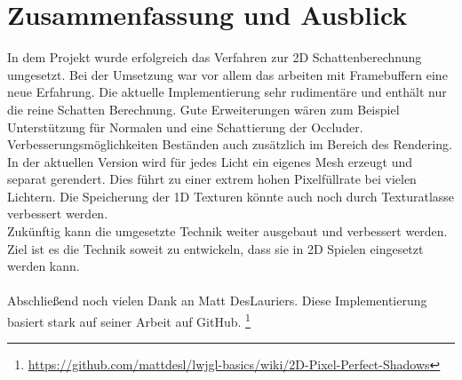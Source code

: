 \chapter{Zusammenfassung und Ausblick}
In dem Projekt wurde erfolgreich das Verfahren zur 2D Schattenberechnung umgesetzt.
Bei der Umsetzung war vor allem das arbeiten mit Framebuffern eine neue Erfahrung.
Die aktuelle Implementierung sehr rudimentäre und enthält nur die reine Schatten Berechnung.
Gute Erweiterungen wären zum Beispiel Unterstützung für Normalen und eine Schattierung der Occluder.
Verbesserungsmöglichkeiten Beständen auch zusätzlich im Bereich des Rendering. In der aktuellen Version wird für jedes Licht ein eigenes Mesh erzeugt und separat gerendert. Dies führt zu einer extrem hohen Pixelfüllrate bei vielen Lichtern.
Die Speicherung der 1D Texturen könnte auch noch durch Texturatlasse verbessert werden.\\
Zukünftig kann die umgesetzte Technik weiter ausgebaut und verbessert werden.
Ziel ist es die Technik soweit zu entwickeln, dass sie in 2D Spielen eingesetzt werden kann.
\\
\\
Abschließend noch vielen Dank an Matt DesLauriers. Diese Implementierung basiert stark auf seiner Arbeit auf GitHub. \footnote{\url{https://github.com/mattdesl/lwjgl-basics/wiki/2D-Pixel-Perfect-Shadows}} \nocite{mattdesl:13} 